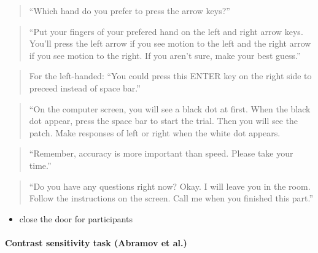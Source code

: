 \documentclass[]{article}
\providecommand{\tightlist}{%
  \setlength{\itemsep}{0pt}\setlength{\parskip}{0pt}}
\let\oldparagraph\paragraph
\renewcommand{\paragraph}[1]{\oldparagraph{#1}\mbox{}}
\begin{document}
\begin{quote}
``Which hand do you prefer to press the arrow keys?''
\end{quote}

\begin{quote}
``Put your fingers of your prefered hand on the left and right arrow
keys. You'll press the left arrow if you see motion to the left and the
right arrow if you see motion to the right. If you aren't sure, make
your best guess.''
\end{quote}

\begin{quote}
For the left-handed: ``You could press this ENTER key on the right side
to preceed instead of space bar.''
\end{quote}

\begin{quote}
``On the computer screen, you will see a black dot at first. When the
black dot appear, press the space bar to start the trial. Then you will
see the patch. Make responses of left or right when the white dot
appears.
\end{quote}

\begin{quote}
``Remember, accuracy is more important than speed. Please take your
time.''
\end{quote}

\begin{quote}
``Do you have any questions right now? Okay. I will leave you in the
room. Follow the instructions on the screen. Call me when you finished
this part.''
\end{quote}

\begin{itemize}
\tightlist
\item
  close the door for participants
\end{itemize}

\paragraph{Contrast sensitivity task (Abramov et
al.)}\label{contrast-sensitivity-task-abramov-et-al.}
\end{document}
